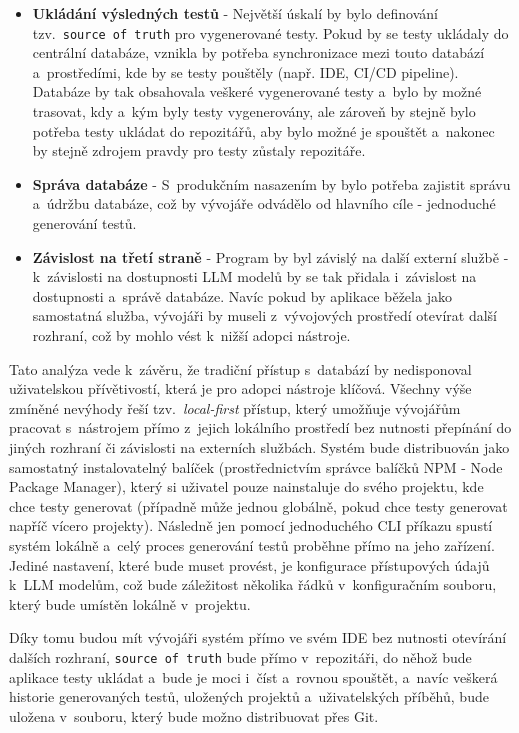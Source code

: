 \documentclass[czech, ing, kiv, he, iso690numb, viewonly]{fasthesis}
\begin{document}
\begin{itemize}
    \item \textbf{Ukládání výsledných testů} - Největší úskalí by bylo definování tzv.~\texttt{source of truth} pro vygenerované testy.
    Pokud by se testy ukládaly do centrální databáze, vznikla by potřeba synchronizace mezi touto databází a~prostředími, kde by se testy pouštěly (např. IDE, CI/CD pipeline).
    Databáze by tak obsahovala veškeré vygenerované testy a~bylo by možné trasovat, kdy a~kým byly testy vygenerovány, 
    ale zároveň by stejně bylo potřeba testy ukládat do repozitářů, aby bylo možné je spouštět a~nakonec by stejně zdrojem pravdy pro testy zůstaly repozitáře.
    \item \textbf{Správa databáze} - S~produkčním nasazením by bylo potřeba zajistit správu a~údržbu databáze, což by vývojáře odvádělo od hlavního cíle - jednoduché generování testů.
    \item \textbf{Závislost na třetí straně} - Program by byl závislý na další externí službě - k~závislosti na dostupnosti LLM modelů by se tak přidala i~závislost na dostupnosti a~správě databáze. Navíc pokud by aplikace běžela jako samostatná služba, vývojáři by museli z~vývojových prostředí otevírat další rozhraní, což 
    by mohlo vést k~nižší adopci nástroje.
\end{itemize}

Tato analýza vede k~závěru, že tradiční přístup s~databází by nedisponoval uživatelskou přívětivostí, která je pro adopci nástroje klíčová.
Všechny výše zmíněné nevýhody řeší tzv.~\textit{local-first} přístup, 
který umožňuje vývojářům pracovat s~nástrojem přímo z~jejich lokálního prostředí bez nutnosti přepínání do jiných rozhraní či závislosti na externích službách.
Systém bude distribuován jako samostatný instalovatelný balíček (prostřednictvím správce balíčků NPM - Node Package Manager), 
který si uživatel pouze nainstaluje do svého projektu, kde chce testy generovat (případně může jednou globálně, pokud chce testy generovat napříč vícero projekty).
Následně jen pomocí jednoduchého CLI příkazu spustí systém lokálně a~celý proces generování testů proběhne přímo na jeho zařízení. Jediné nastavení, které bude muset provést, 
je konfigurace přístupových údajů k~LLM modelům, což bude záležitost několika řádků v~konfiguračním souboru, který bude umístěn lokálně v~projektu.

Díky tomu budou mít vývojáři systém přímo ve svém IDE bez nutnosti otevírání dalších rozhraní, \texttt{source of truth} bude přímo v~repozitáři, do něhož bude aplikace testy ukládat a~bude 
je moci i~číst a~rovnou spouštět, a~navíc veškerá historie generovaných testů, uložených projektů a~uživatelských příběhů, bude uložena v~souboru, který bude možno distribuovat přes Git.
\end{document}
